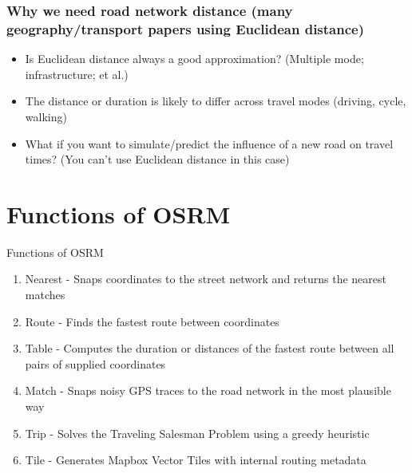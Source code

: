 \documentclass{beamer}
\begin{document}
\begin{frame}
\frametitle{Why we need road network distance (many geography/transport papers using Euclidean distance)}
  \begin{itemize}
  \item Is Euclidean distance always a good approximation? (Multiple mode; infrastructure; et al.)
  \item The distance or duration is likely to differ across travel modes (driving, cycle, walking)
  \item What if you want to simulate/predict the influence of a new road on travel times? (You can't use Euclidean distance in this case)
  \end{itemize}
\end{frame}

\section{Functions of OSRM}
\begin{frame}{Functions of OSRM}
\begin{enumerate}
\item Nearest - Snaps coordinates to the street network and returns the nearest matches
\item Route - Finds the fastest route between coordinates
\item Table - Computes the duration or distances of the fastest route between all pairs of supplied coordinates
\item Match - Snaps noisy GPS traces to the road network in the most plausible way
\item Trip - Solves the Traveling Salesman Problem using a greedy heuristic
\item Tile - Generates Mapbox Vector Tiles with internal routing metadata    
\end{enumerate}
\end{frame}
\end{document}
